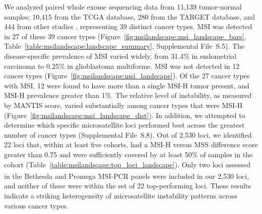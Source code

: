 We analyzed paired whole exome sequencing data from 11,139 tumor-normal samples; 10,415 from the TCGA \cite{tcgageneric} database, 280 from the TARGET \cite{target} database, and 444 from other studies \cite{landau2015,choi2015,zheng2016,ong2012,chanon2013}, representing 39 distinct cancer types. MSI was detected in 27 of these 39 cancer types (Figure~\ref{fig:msilandscape:msi_landscape_bars}, Table~\ref{table:msilandscape:landscape_summary}, Supplemental File~S\thechapter{}.5). The disease-specific prevalence of MSI varied widely, from 31.4\% in endometrial carcinoma to 0.25\% in glioblastoma multiforme. MSI was not detected in 12 cancer types (Figure~\ref{fig:msilandscape:msi_landscape}). Of the 27 cancer types with MSI, 12 were found to have more than a single MSI-H tumor present, and MSI-H prevalence greater than 1\%. The relative level of instability, as measured by MANTIS score, varied substantially among cancer types that were MSI-H (Figure~\ref{fig:msilandscape:msi_landscape_dist}). In addition, we attempted to determine which specific microsatellite loci performed best across the greatest number of cancer types (Supplemental File~S\thechapter{}.8). Out of 2,530 loci, we identified 22 loci that, within at least five cohorts, had a MSI-H versus MSS difference score greater than 0.75 and were sufficiently covered by at least 50\% of samples in the cohort (Table~\ref{table:msilandscape:top_loci_landscape}). Only two loci assessed in the Bethesda \cite{boland1998} and Promega\textsuperscript\texttrademark{} \cite{bacher2004} MSI-PCR panels were included in our 2,530 loci, and neither of these were within the set of 22 top-performing loci. These results indicate a striking heterogeneity of microsatellite instability patterns across various cancer types.


